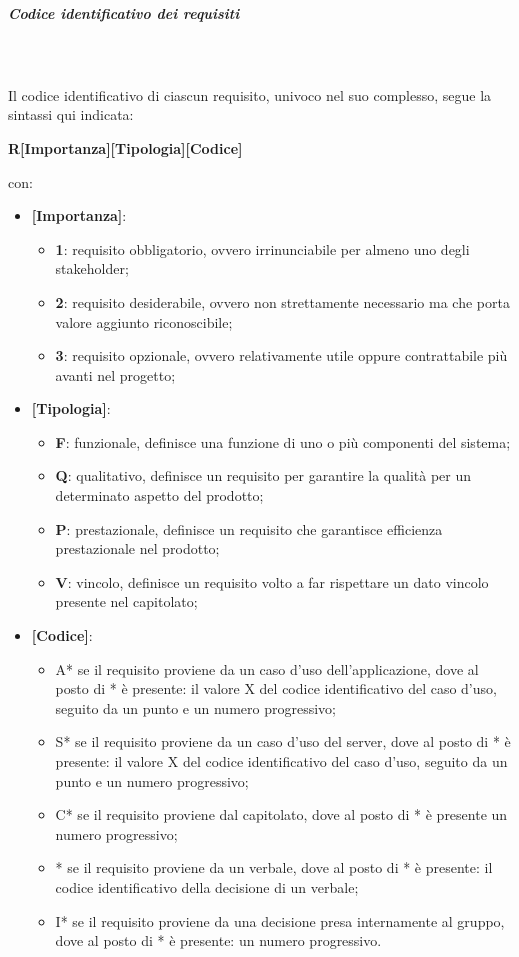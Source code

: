 \subparagraph*{Codice identificativo dei requisiti}\mbox{}\\ \\
Il codice identificativo di ciascun requisito, univoco nel suo complesso, segue la sintassi qui indicata:
\begin{center}
	\textbf{R[Importanza][Tipologia][Codice]}
\end{center}
con:
\begin{itemize}
	\item \textbf{[Importanza]}:
	\begin{itemize}
		\item \textbf{1}: requisito obbligatorio, ovvero irrinunciabile per almeno uno degli stakeholder;
		\item \textbf{2}: requisito desiderabile, ovvero non strettamente necessario ma che porta valore aggiunto riconoscibile;
		\item \textbf{3}: requisito opzionale, ovvero relativamente utile oppure contrattabile più avanti nel progetto;
	\end{itemize}
	\item \textbf{[Tipologia]}:
	\begin{itemize}
		\item \textbf{F}: funzionale, definisce una funzione di uno o più componenti del sistema;
		\item \textbf{Q}: qualitativo, definisce un requisito per garantire la qualità per un determinato aspetto del prodotto;
		\item \textbf{P}: prestazionale, definisce un requisito che garantisce efficienza prestazionale nel prodotto;
		\item \textbf{V}: vincolo, definisce un requisito volto a far rispettare un dato vincolo presente nel capitolato;
	\end{itemize}
	\item \textbf{[Codice]}:
	\begin{itemize}
		\item A* se il requisito proviene da un caso d'uso dell'applicazione, dove al posto di * è presente: il valore X del codice identificativo del caso d'uso, seguito da un punto e un numero progressivo;
		\item S* se il requisito proviene da un caso d'uso del server, dove al posto di * è presente: il valore X del codice identificativo del caso d'uso, seguito da un punto e un numero progressivo;
		\item C* se il requisito proviene dal capitolato, dove al posto di * è presente un numero progressivo;
		\item * se il requisito proviene da un verbale, dove al posto di * è presente: il codice identificativo della decisione di un verbale;
		\item I* se il requisito proviene da una decisione presa internamente al gruppo, dove al posto di * è presente: un numero progressivo.
	\end{itemize}
\end{itemize}

